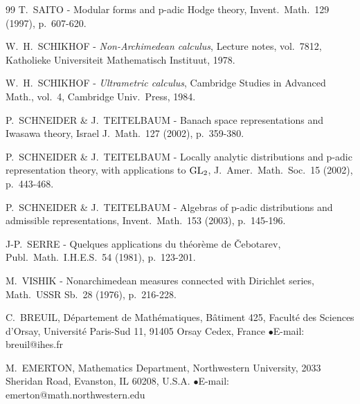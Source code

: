 \begin{thebibliography}{99}
 T.~SAITO - Modular forms and p-adic Hodge theory, Invent.\ Math.\ 129 (1997), p.~607-620.

 W.~H.~SCHIKHOF - \emph{Non-Archimedean calculus}, Lecture notes, vol.~7812, Katholieke Universiteit Mathematisch Instituut, 1978.

 W.~H.~SCHIKHOF - \emph{Ultrametric calculus}, Cambridge Studies in Advanced Math., vol.~4, Cambridge Univ.\ Press, 1984.

 P.~SCHNEIDER \& J.~TEITELBAUM - Banach space representations and Iwasawa theory, Israel J.\ Math.\ 127 (2002), p.~359-380.

 P.~SCHNEIDER \& J.~TEITELBAUM - Locally analytic distributions and p-adic representation theory, with applications to $\mathrm{GL}_2$, J.\ Amer.\ Math.\ Soc.\ 15 (2002), p.~443-468.

 P.~SCHNEIDER \& J.~TEITELBAUM - Algebras of p-adic distributions and admissible representations, Invent.\ Math.\ 153 (2003), p.~145-196.

 J-P.~SERRE - Quelques applications du th\'eor\`eme de \v{C}ebotarev, Publ.\ Math.\ I.H.E.S.\ 54 (1981), p.~123-201.

 M.~VISHIK - Nonarchimedean measures connected with Dirichlet series, Math.\ USSR Sb.\ 28 (1976), p.~216-228.

\end{thebibliography}

\vspace{1.5em}

\noindent C.~BREUIL, D\'epartement de Math\'ematiques, B\^atiment 425, Facult\'e des Sciences d'Orsay, Universit\'e Paris-Sud 11, 91405 Orsay Cedex, France \quad$\bullet$\quad E-mail: breuil@ihes.fr

\noindent M.~EMERTON, Mathematics Department, Northwestern University, 2033 Sheridan Road, Evanston, IL 60208, U.S.A. \quad$\bullet$\quad E-mail: emerton@math.northwestern.edu

